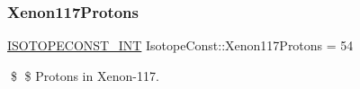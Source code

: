 \subsubsection{\texorpdfstring{Xenon117\+Protons}{Xenon117Protons}}
{\footnotesize\ttfamily \mbox{\hyperlink{group___isotope_const-_macros_ga5f18360b3e99483a35c32d789e62621c}{I\+S\+O\+T\+O\+P\+E\+C\+O\+N\+S\+T\+\_\+\+I\+NT}} Isotope\+Const\+::\+Xenon117\+Protons = 54}

\$ \$ Protons in Xenon-\/117. 